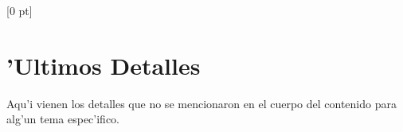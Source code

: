 \titlespacing{\chapter}{0 pt}{30 pt}{50 pt}[0 pt]
\titleformat{\section}{\Large\bfseries}{\thesection}{0 pt}{\hspace{30 pt}}
\titleformat{\subsection}{\large\bfseries}{\thesubsection}{0 pt}{\hspace{30 pt}}
\pagestyle{fancy}
\fancyhead[LO,LE]{\footnotesize\emph{\leftmark}}
\fancyhead[RO,RE]{\thepage}
\fancyfoot[CO,CE]{}

\chapter{'Ultimos Detalles} %

\normalsize
Aqu'i vienen los detalles que no se mencionaron en el cuerpo del contenido para alg'un tema espec'ifico.
